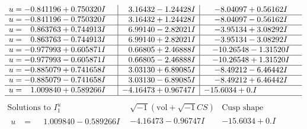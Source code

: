 \documentclass[1p]{elsarticle_modified}
\theoremstyle{definition}
\newcommand{\I}{\sqrt{-1}}
\begin{document}
$$\begin{array}{c|c|c}
\begin{aligned}
u &= -0.841196 + 0.750320 I\end{aligned}
 & \phantom{-}3.16432 - 1.24428 I & -8.04097 + 0.56162 I \\ \hline\begin{aligned}
u &= -0.841196 - 0.750320 I\end{aligned}
 & \phantom{-}3.16432 + 1.24428 I & -8.04097 - 0.56162 I \\ \hline\begin{aligned}
u &= \phantom{-}0.863763 + 0.744913 I\end{aligned}
 & \phantom{-}6.99140 - 2.82021 I & -3.95134 + 3.08292 I \\ \hline\begin{aligned}
u &= \phantom{-}0.863763 - 0.744913 I\end{aligned}
 & \phantom{-}6.99140 + 2.82021 I & -3.95134 - 3.08292 I \\ \hline\begin{aligned}
u &= -0.977993 + 0.605871 I\end{aligned}
 & \phantom{-}0.66805 + 2.46888 I & -10.26548 - 1.31520 I \\ \hline\begin{aligned}
u &= -0.977993 - 0.605871 I\end{aligned}
 & \phantom{-}0.66805 - 2.46888 I & -10.26548 + 1.31520 I \\ \hline\begin{aligned}
u &= -0.885079 + 0.741658 I\end{aligned}
 & \phantom{-}3.03130 + 6.89085 I & -8.49212 - 6.46442 I \\ \hline\begin{aligned}
u &= -0.885079 - 0.741658 I\end{aligned}
 & \phantom{-}3.03130 - 6.89085 I & -8.49212 + 6.46442 I \\ \hline\begin{aligned}
u &= \phantom{-}1.009840 + 0.589266 I\end{aligned}
 & -4.16473 + 0.96747 I & -15.6034 + 0. I\phantom{ +0.000000I}\\
 \hline 
 \end{array}$$\newpage$$\begin{array}{c|c|c}  
\text{Solutions to }I^u_{1}& \I (\text{vol} + \sqrt{-1}CS) & \text{Cusp shape}\\
 \hline 
\begin{aligned}
u &= \phantom{-}1.009840 - 0.589266 I\end{aligned}
 & -4.16473 - 0.96747 I & -15.6034 + 0. I\phantom{ +0.000000I} \\ \hline\begin{aligned}

\end{aligned}
\end{array}$$
\end{document}
